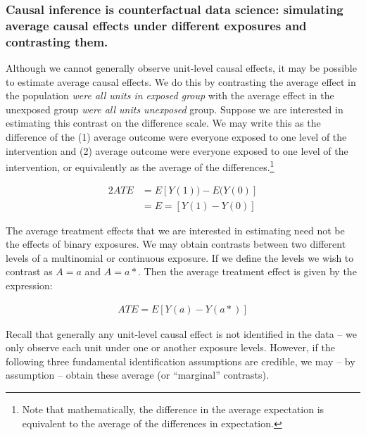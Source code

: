 \documentclass[
  singlecolumn]{report}
\begin{document}
\hypertarget{causal-inference-is-counterfactual-data-science-simulating-average-causal-effects-under-different-exposures-and-contrasting-them.}{%
\subsubsection{Causal inference is counterfactual data science:
simulating average causal effects under different exposures and
contrasting
them.}\label{causal-inference-is-counterfactual-data-science-simulating-average-causal-effects-under-different-exposures-and-contrasting-them.}}

Although we cannot generally observe unit-level causal effects, it may
be possible to estimate average causal effects. We do this by
contrasting the average effect in the population \emph{were all units in
exposed group} with the average effect in the unexposed group \emph{were
all units unexposed} group. Suppose we are interested in estimating this
contrast on the difference scale. We may write this as the difference of
the (1) average outcome were everyone exposed to one level of the
intervention and (2) average outcome were everyone exposed to one level
of the intervention, or equivalently as the average of the
differences.\footnote{Note that mathematically, the difference in the
  average expectation is equivalent to the average of the differences in
  expectation.}

\begin{alignat*}{2}
ATE & = E[Y(1)) - E(Y(0)]\\
& = E=[Y(1) - Y(0)]
\end{alignat*}

The average treatment effects that we are interested in estimating need
not be the effects of binary exposures. We may obtain contrasts between
two different levels of a multinomial or continuous exposure. If we
define the levels we wish to contrast as \(A = a\) and \(A = a*\). Then
the average treatment effect is given by the expression:

   \begin{align*}
    ATE = E[Y(a) - Y(a*)]
    \end{align*}

Recall that generally any unit-level causal effect is not identified in
the data -- we only observe each unit under one or another exposure
levels. However, if the following three fundamental identification
assumptions are credible, we may -- by assumption -- obtain these
average (or ``marginal'' contrasts).
\end{document}
